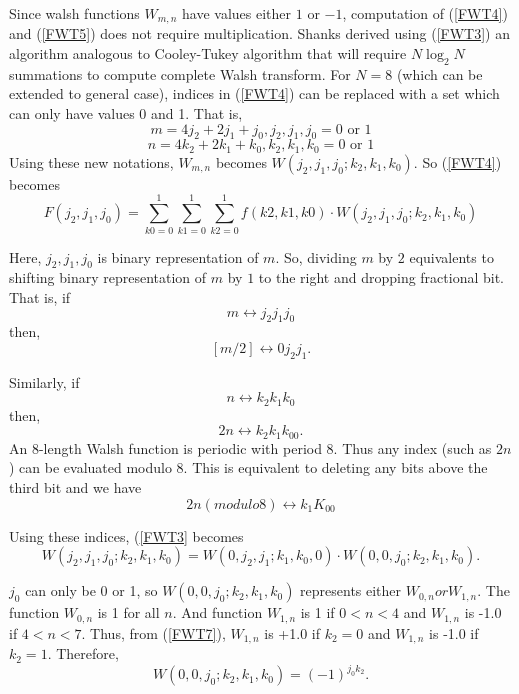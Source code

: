 Since walsh functions $W_{m,n}$ have values either $1$ or $-1$, computation of (\ref{FWT4}) and (\ref{FWT5}) does not require multiplication.
Shanks \cite{Shanks1969} derived using (\ref{FWT3}) an algorithm analogous to Cooley-Tukey algorithm that will require $N \log_2 N$ summations to compute complete Walsh transform. \linebreak
For $N = 8$ (which can be extended to general case),\linebreak
indices in (\ref{FWT4}) can be replaced with a set which can only have values 0 and 1. That is, 
\begin{equation}
\label{FWT6}
m = 4j_2 + 2j_1 + j_0, \text{$j_2, j_1, j_0 = 0$ or $1$}
\end{equation}
\begin{equation}
\label{FWT7}
n = 4k_2 + 2k_1 + k_0, \text{$k_2, k_1, k_0 = 0$ or $1$}
\end{equation}
Using these new notations, $W_{m,n}$ becomes $W(j_2,j_1,j_0;k_2,k_1,k_0)$. So (\ref{FWT4}) becomes 
\begin{equation}
\label{FWT8}
F(j_2,j_1,j_0) = \sum\limits_{k0 = 0}^1 \sum\limits_{k1 = 0}^1 \sum\limits_{k2 = 0}^1 f(k2,k1,k0) \cdot W(j_2,j_1,j_0;k_2,k_1,k_0)
\end{equation}

Here, $j_2,j_1,j_0$ is binary representation of $m$. So, dividing $m$ by $2$ equivalents to shifting binary representation of $m$ by $1$ to the right and dropping fractional bit. That is, if 
\[
m \leftrightarrow j_2j_1j_0
\]
then,
\[
[m/2] \leftrightarrow 0j_2j_1.
\]

Similarly, if
\[
n \leftrightarrow k_2k_1k_0
\]
then,
\[
2n \leftrightarrow k_2k_1k_00.
\]
An 8-length Walsh function is periodic with period 8. Thus any index (such as $2n$) can be evaluated modulo 8. This is equivalent to deleting any bits above the third bit and we have 
\[
2n(modulo 8) \leftrightarrow k_1K_00
\]

Using these indices, (\ref{FWT3} becomes
\begin{equation}
\label{FWT9}
W(j_2,j_1,j_0;k_2,k_1,k_0) = W(0,j_2,j_1;k_1,k_0,0) \cdot W(0,0,j_0;k_2,k_1,k_0).
\end{equation}

$j_0$ can only be 0 or 1, so $W(0,0,j_0; k_2, k_1, k_0)$ represents either $W_{0,n} or W_{1,n}$. The function $W_{0,n}$ is 1 for all $n$. And function $W_{1,n}$ is 1 if $0<n<4$ and $W_{1,n}$ is -1.0 if $4<n<7$. Thus, from (\ref{FWT7}), $W_{1,n}$ is +1.0 if $k_2=0$ and $W_{1,n}$ is -1.0 if $k_2 = 1$. Therefore, 
\begin{equation}
\label{FWT10}
W(0,0,j_0;k_2,k_1,k_0) = (-1)^{j_0k_2}.
\end{equation}


